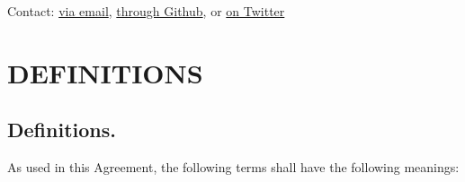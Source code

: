 \documentclass[
]{book}
\begin{document}
Contact: \href{atlhawksfanatic@gmail.com}{via email}, \href{https://github.com/atlhawksfanatic}{through Github}, or \href{https://twitter.com/atlhawksfanatic}{on Twitter}

\hypertarget{definitions}{%
\chapter{DEFINITIONS}\label{definitions}}

\hypertarget{definitions.}{%
\section{Definitions.}\label{definitions.}}

As used in this Agreement, the following terms shall have the following meanings:
\end{document}
